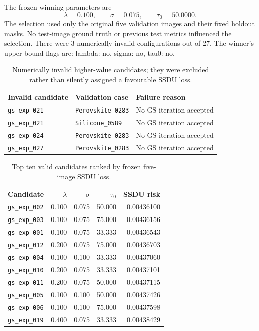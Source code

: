 \documentclass[10pt,a4paper]{article}
\begin{document}
The frozen winning parameters are
\[
\lambda=0.100,\qquad
\sigma=0.075,\qquad
\tau_0=50.0000.
\]
The selection used only the original five validation images
and their fixed holdout masks. No test-image ground truth or
previous test metrics influenced the selection.
There were 3 numerically invalid configurations
out of 27. The winner's upper-bound flags are:
lambda: no, sigma: no, tau0: no.

\begin{table}[htbp]
\centering\small
\begin{tabular}{@{}lll@{}}
\toprule
Invalid candidate & Validation case & Failure reason\\
\midrule
\texttt{gs\_exp\_021} & \texttt{Perovskite\_0283} & No GS iteration accepted \\
\texttt{gs\_exp\_021} & \texttt{Silicone\_0589} & No GS iteration accepted \\
\texttt{gs\_exp\_024} & \texttt{Perovskite\_0283} & No GS iteration accepted \\
\texttt{gs\_exp\_027} & \texttt{Perovskite\_0283} & No GS iteration accepted \\
\bottomrule
\end{tabular}
\caption{Numerically invalid higher-value candidates; they were
excluded rather than silently assigned a favourable SSDU loss.}
\end{table}

\begin{table}[htbp]
\centering\small
\begin{tabular}{@{}lrrrr@{}}
\toprule
\textbf{Candidate}&$\lambda$&$\sigma$&$\tau_0$&\textbf{SSDU risk}\\
\midrule
\texttt{gs\_exp\_002} & 0.100 & 0.075 & 50.000 & 0.00436100 \\
\texttt{gs\_exp\_003} & 0.100 & 0.075 & 75.000 & 0.00436156 \\
\texttt{gs\_exp\_001} & 0.100 & 0.075 & 33.333 & 0.00436543 \\
\texttt{gs\_exp\_012} & 0.200 & 0.075 & 75.000 & 0.00436703 \\
\texttt{gs\_exp\_004} & 0.100 & 0.100 & 33.333 & 0.00437060 \\
\texttt{gs\_exp\_010} & 0.200 & 0.075 & 33.333 & 0.00437101 \\
\texttt{gs\_exp\_011} & 0.200 & 0.075 & 50.000 & 0.00437115 \\
\texttt{gs\_exp\_005} & 0.100 & 0.100 & 50.000 & 0.00437426 \\
\texttt{gs\_exp\_006} & 0.100 & 0.100 & 75.000 & 0.00437598 \\
\texttt{gs\_exp\_019} & 0.400 & 0.075 & 33.333 & 0.00438429 \\
\bottomrule
\end{tabular}
\caption{Top ten valid candidates ranked by frozen five-image SSDU loss.}
\end{table}
\end{document}
